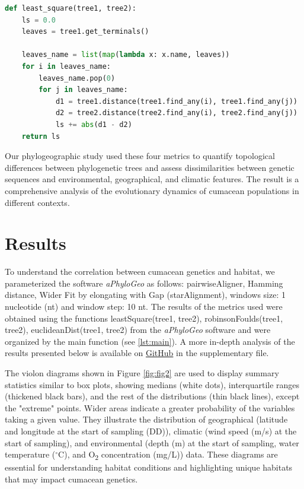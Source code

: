 \begin{lstlisting}[label=lst:LeastSquare, language=Python, caption=Python script for calculating the Least-Square distance using the ete3 package in the aPhyloGeo package]
def least_square(tree1, tree2):
    ls = 0.0
    leaves = tree1.get_terminals()

    leaves_name = list(map(lambda x: x.name, leaves))
    for i in leaves_name:
        leaves_name.pop(0)
        for j in leaves_name:
            d1 = tree1.distance(tree1.find_any(i), tree1.find_any(j))
            d2 = tree2.distance(tree2.find_any(i), tree2.find_any(j))
            ls += abs(d1 - d2)
    return ls
\end{lstlisting}

Our phylogeographic study used these four metrics to quantify topological differences between phylogenetic trees and assess dissimilarities between genetic sequences and environmental, geographical, and climatic features. The result is a comprehensive analysis of the evolutionary dynamics of cumacean populations in different contexts.

\section{Results}\label{results}

To understand the correlation between cumacean genetics and habitat, we parameterized the software \textit{aPhyloGeo} as follows: pairwiseAligner, Hamming distance, Wider Fit by elongating with Gap (starAlignment), windows size: 1 nucleotide (nt) and window step: 10 nt. The results of the metrics used were obtained using the functions leastSquare(tree1, tree2), robinsonFoulds(tree1, tree2), euclideanDist(tree1, tree2) from the \textit{aPhyloGeo} software and were organized by the main function (see \autoref{lst:main}). A more in-depth analysis of the results presented below is available on \href{https://github.com/tahiri-lab/Cumacea_aPhyloGeo}{GitHub} in the supplementary file.

The violon diagrams shown in Figure \ref{fig:fig2} are used to display summary statistics similar to box plots, showing medians (white dots), interquartile ranges (thickened black bars), and the rest of the distributions (thin black lines), except the "extreme" points. Wider areas indicate a greater probability of the variables taking a given value. They illustrate the distribution of geographical (latitude and longitude at the start of sampling (DD)), climatic (wind speed (m/s) at the start of sampling), and environmental (depth (m) at the start of sampling, water temperature ($^\circ$C), and O\textsubscript{2} concentration (mg/L)) data. These diagrams are essential for understanding habitat conditions and highlighting unique habitats that may impact cumacean genetics. 

